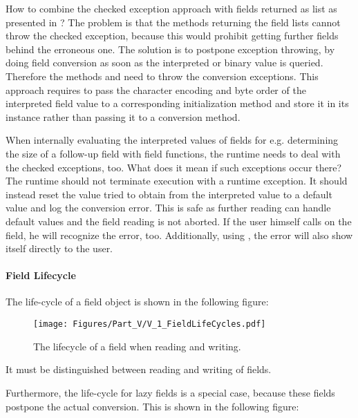 How to combine the checked exception approach with fields returned as list as presented in ? The problem is that the methods returning the field lists cannot throw the checked exception, because this would prohibit getting further fields behind the erroneous one. The solution is to postpone exception throwing, by doing field conversion as soon as the interpreted or binary value is queried. Therefore the \IFfield{} methods \METHgetInterpretedValue{} and \METHgetBinaryValue{} need to throw the conversion exceptions. This approach requires to pass the character encoding and byte order of the interpreted field value to a corresponding initialization method and store it in its instance rather than passing it to a conversion method.

When internally evaluating the interpreted values of fields for e.g. determining the size of a follow-up field with field functions, the runtime needs to deal with the checked exceptions, too. What does it mean if such exceptions occur there? The runtime should not terminate execution with a runtime exception. It should instead reset the value tried to obtain from the interpreted value to a default value and log the conversion error. This is safe as further reading can handle default values and the field reading is not aborted. If the user himself calls \METHgetInterpretedValue{} on the field, he will recognize the error, too. Additionally, using \COMPvalidation{}, the error will also show itself directly to the user.


\paragraph{Field Lifecycle}
\label{sec:FieldLifecycle}

The life-cycle of a field object is shown in the following figure:

\begin{figure}[H]
	\centering
	\texttt{[image: Figures/Part\_V/V\_1\_FieldLifeCycles.pdf]}
	\caption{The lifecycle of a field when reading and writing.}
	\label{fig:V_1_FieldLifeCycles}
\end{figure}

It must be distinguished between reading and writing of fields.

Furthermore, the life-cycle for lazy fields is a special case, because these fields postpone the actual conversion. This is shown in the following figure:

